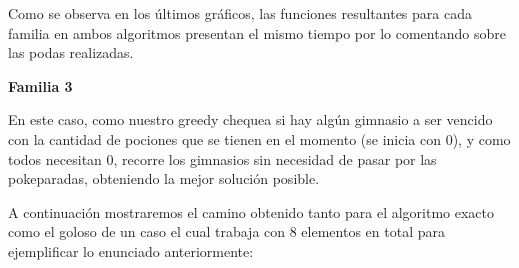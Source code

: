 \begin{figure} 
 \centering
       \label{fig:jaggies}
    \label{fig:moire}
    \end{figure}


Como se observa en los \'ultimos gr\'aficos, las funciones resultantes para cada familia en ambos algoritmos presentan el mismo tiempo por lo comentando sobre las podas realizadas.

\begin{center}
\textbf{Familia 3}
\end{center}

En este caso, como nuestro greedy chequea si hay alg\'un gimnasio a ser vencido con la cantidad de pociones que se tienen en el momento (se inicia con 0), y como todos necesitan 0, recorre los gimnasios sin necesidad de pasar por las pokeparadas, obteniendo la mejor soluci\'on posible.

A continuaci\'on mostraremos el camino obtenido tanto para el algoritmo exacto como el goloso de un caso el cual trabaja con 8 elementos en total para ejemplificar lo enunciado anteriormente:

